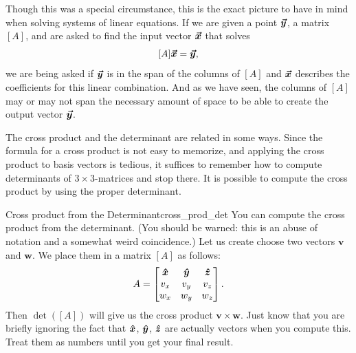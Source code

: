         Though this was a special circumstance, this is the exact picture to have in mind when solving systems of linear equations.  If we are given a point $\boldsymbol{\boldsymbol{\vec{y}}}$, a matrix $[A]$, and are asked to find the input vector $\boldsymbol{\boldsymbol{\vec{x}}}$ that solves
        \[
        [A]\boldsymbol{\boldsymbol{\vec{x}}} = \boldsymbol{\boldsymbol{\vec{y}}},
        \]
        we are being asked if $\boldsymbol{\boldsymbol{\vec{y}}}$ is in the span of the columns of $[A]$ and $\boldsymbol{\boldsymbol{\vec{x}}}$ describes the coefficients for this linear combination.  And as we have seen, the columns of $[A]$ may or may not span the necessary amount of space to be able to create the output vector $\boldsymbol{\boldsymbol{\vec{y}}}$.
        
        The cross product and the determinant are related in some ways.  Since the formula for a cross product is not easy to memorize, and applying the cross product to basis vectors is tedious, it suffices to remember how to compute determinants of $3\times 3$-matrices and stop there. It is possible to compute the cross product by using the proper determinant. 
        
        \begin{ex}{Cross product from the Determinant}{cross_prod_det}
        You can compute the cross product from the determinant.  (You should be warned: this is an abuse of notation and a somewhat weird coincidence.) Let us create choose two vectors $\mathbf{v}$ and $\mathbf{w}$. We place them in a matrix $[A]$ as follows:
        \[
        A=
        \begin{bmatrix}
        \boldsymbol{\hat{x}} & \boldsymbol{\hat{y}} & \boldsymbol{\hat{z}}\\
        v_x & v_y & v_z\\
        w_x & w_y & w_z
        \end{bmatrix}.
        \]
        Then $\det([A])$ will give us the cross product $\mathbf{v}\times \mathbf{w}$.  Just know that you are briefly ignoring the fact that $\boldsymbol{\hat{x}}$, $\boldsymbol{\hat{y}}$, $\boldsymbol{\hat{z}}$ are actually vectors when you compute this.  Treat them as numbers until you get your final result.
        \end{ex}
        
        
